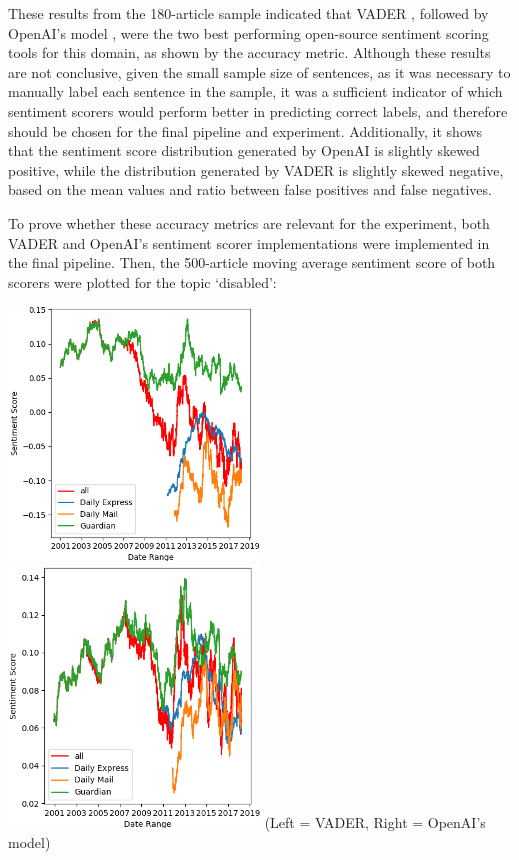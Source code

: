 \documentclass{report}
\begin{document}
These results from the 180-article sample indicated that VADER \cite{VADER}, followed by OpenAI's model \cite{OpenAI}, were the two best performing open-source sentiment scoring tools for this domain, as shown by the accuracy metric.
Although these results are not conclusive, given the small sample size of sentences, as it was necessary to manually label each sentence in the sample, it was a sufficient indicator of which sentiment scorers would perform better in predicting correct labels, and therefore should be chosen for the final pipeline and experiment.
Additionally, it shows that the sentiment score distribution generated by OpenAI is slightly skewed positive, while the distribution generated by VADER is slightly skewed negative, based on the mean values and ratio between false positives and false negatives.

To prove whether these accuracy metrics are relevant for the experiment, both VADER and OpenAI's sentiment scorer implementations were implemented in the final pipeline.
Then, the 500-article moving average sentiment score of both scorers were plotted for the topic `disabled':

\noindent
\includegraphics[width=0.5\textwidth]{vader.png}
\includegraphics[width=0.5\textwidth]{openai.png}
(Left = VADER, Right = OpenAI's model)
\vspace{0.5em}
\end{document}
